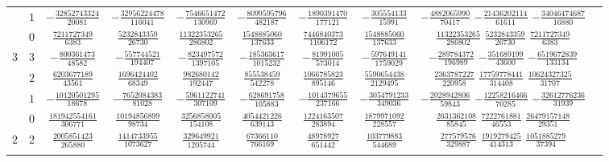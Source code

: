 \begin{table}
\begin{center}
\begin{tabular}{cccccccccc}
           &  $1$  &  $-\frac{ 32852743324}{  20081}$  &  $-\frac{ 32956224478}{ 116041}$  &  $-\frac{ 7546651472}{  130969}$  &  $-\frac{8099595796}{  482187}$  &  $-\frac{1890391470}{  177121}$  &  $-\frac{ 305554133}{   15991}$  &  $-\frac{ 4882065990}{   70417}$  $-\frac{ 21436202114}{  61611}$  $-\frac{ 34046474687}{  16880}$  \\ \addlinespace
           &  $0$  &  $ \frac{  7211727349}{   6383}$  &  $ \frac{  5232843359}{  26730}$  &  $ \frac{11322353265}{  286802}$  &  $ \frac{1548885060}{  137633}$  &  $ \frac{7446840373}{ 1106172}$  &  $ \frac{1548885060}{  137633}$  &  $ \frac{11322353265}{  286802}$  $ \frac{  5232843359}{  26730}$  $ \frac{  7211727349}{   6383}$  \\ \addlinespace
      $3$  &  $3$  &  $-\frac{   800361473}{  48582}$  &  $-\frac{   557744521}{ 194407}$  &  $-\frac{  823497572}{ 1397105}$  &  $-\frac{ 185363617}{ 1015232}$  &  $-\frac{  81991005}{  573014}$  &  $-\frac{ 597649141}{ 1759029}$  &  $-\frac{  289784372}{  196989}$  $-\frac{   351689199}{  43600}$  $-\frac{  6519672839}{ 133134}$  \\ \addlinespace
           &  $2$  &  $ \frac{  6203677189}{  43561}$  &  $ \frac{  1696424402}{  68349}$  &  $ \frac{  982680142}{  192447}$  &  $ \frac{ 855538459}{  542278}$  &  $ \frac{1066785823}{  895146}$  &  $ \frac{5590654438}{ 2129495}$  &  $ \frac{ 2363787227}{  220958}$  $ \frac{ 17759778441}{ 314408}$  $ \frac{ 10624327325}{  31707}$  \\ \addlinespace
           &  $1$  &  $-\frac{ 10120501295}{  18678}$  &  $-\frac{  7652084383}{  81028}$  &  $-\frac{ 5961122741}{  307109}$  &  $-\frac{ 628691758}{  105883}$  &  $-\frac{1014379655}{  237166}$  &  $-\frac{3054791233}{  349036}$  &  $-\frac{ 2028942806}{   59843}$  $-\frac{ 12258216466}{  70285}$  $-\frac{ 32612776236}{  31939}$  \\ \addlinespace
           &  $0$  &  $ \frac{181942554161}{ 306771}$  &  $ \frac{ 10194856899}{  98734}$  &  $ \frac{ 3256858005}{  154108}$  &  $ \frac{4054421226}{  639143}$  &  $ \frac{1224163507}{  283894}$  &  $ \frac{1879971092}{  228557}$  &  $ \frac{ 2631362108}{   85845}$  $ \frac{  7222761881}{  46553}$  $ \frac{ 26479157148}{  29351}$  \\ \addlinespace
      $2$  &  $2$  &  $ \frac{  2005851423}{ 265880}$  &  $ \frac{  1414733955}{1073627}$  &  $ \frac{  329649921}{ 1205744}$  &  $ \frac{  67366110}{  766169}$  &  $ \frac{  48978927}{  651442}$  &  $ \frac{ 103779883}{  544689}$  &  $ \frac{  277579576}{  329887}$  $ \frac{  1919279425}{ 414313}$  $ \frac{  1051885279}{  37394}$  \\ \addlinespace

\end{tabular}
\end{center}
\end{table}
